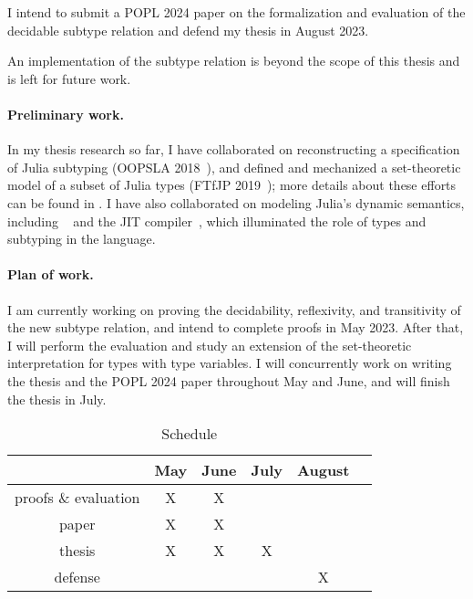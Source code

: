 I intend to submit a POPL 2024 paper on the formalization and evaluation of
the decidable subtype relation and defend my thesis in August 2023.

An implementation of the subtype relation is beyond the scope of this thesis and
is left for future work.


\paragraph*{Preliminary work.}
In my thesis research so far,
I have collaborated on reconstructing a specification of Julia subtyping
(OOPSLA 2018~\cite{TODO}),
and defined and mechanized a set-theoretic model of a subset of Julia types
(FTfJP 2019~\cite{TODO});
more details about these efforts can be found in .
I have also collaborated on modeling Julia's dynamic semantics, including
~\cite{TODO}
and the JIT compiler~\cite{TODO},
which illuminated the role of types and subtyping
in the language.

\paragraph*{Plan of work.}
I am currently working on proving the decidability, reflexivity,
and transitivity of the new subtype relation,
and intend to complete proofs in May 2023.
After that, I will perform the evaluation
and study an extension of the set-theoretic interpretation
for types with type variables.
I will concurrently work on writing the thesis and the POPL 2024 paper
throughout May and June, and will finish the thesis in July.

\begin{table}[h]
  \caption{Schedule}
  \vspace*{0.25em}
  \centering\footnotesize
  \begin{tabular}{c|ccccc}
  \toprule
  & May & June & July & August \\
  \midrule
  proofs \& evaluation & X & X & & \\
  paper & X & X & & \\
  thesis & X & X & X & \\
  defense & & & & X \\
\end{tabular}
\end{table}

